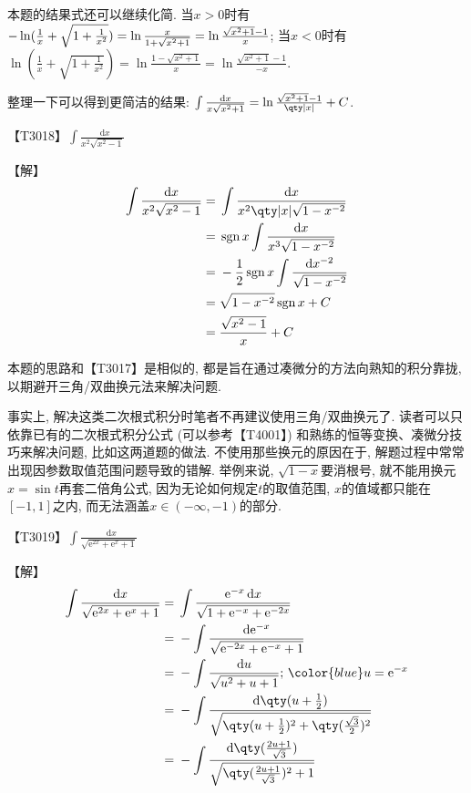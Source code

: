 \documentclass{ctexbook}
\DeclareMathOperator{\sgn}{sgn}
\newcommand{\e}{\mathrm{e}}
\newcommand*{\dif}{\mathop{}\!\mathrm{d}}
\begin{document}
{{本题的结果式还可以继续化简. 当$x>0$时有$-\ln(\frac{1}{x}+\sqrt{1+\frac{1}{x^{2}}})=\ln{\frac{x}{1+\sqrt{x^{2}+1}}}\\=\ln{\frac{\sqrt{x^{2}+1}-1}{x}}$; 当$x<0$时有$\ln(\frac{1}{x}+\sqrt{1+\frac{1}{x^{2}}})=\ln{\frac{1-\sqrt{x^{2}+1}}{x}}=\ln{\frac{\sqrt{x^{2}+1}-1}{-x}}$. \par
整理一下可以得到更简洁的结果: $\int\frac{\dif{x}}{x\sqrt{x^{2}+1}}=\ln{\frac{\sqrt{x^{2}+1}-1}{\qty|x|}}+C$. \par}
{\color{red}【T3018】}$\int\frac{\dif{x}}{x^{2}\sqrt{x^{2}-1}}$\par
【解】
\begin{align*}
\int\frac{\dif{x}}{x^{2}\sqrt{x^{2}-1}}={}&\int\frac{\dif{x}}{x^{2}\qty|x|\sqrt{1-x^{-2}}}\\
={}&\sgn{x}\int\frac{\dif{x}}{x^{3}\sqrt{1-x^{-2}}}\\
={}&-\frac{1}{2}\sgn{x}\int\frac{\dif{x^{-2}}}{\sqrt{1-x^{-2}}}\\
={}&\sqrt{1-x^{-2}}\sgn{x}+C\\
={}&\frac{\sqrt{x^{2}-1}}{x}+C
\end{align*}\par
{\kaishu 本题的思路和{\color{red}【T3017】}是相似的, 都是旨在通过凑微分的方法向熟知的积分靠拢, 以期避开三角/双曲换元法来解决问题. \par
事实上, 解决这类二次根式积分时笔者不再建议使用三角/双曲换元了. 读者可以只依靠已有的二次根式积分公式 (可以参考【T4001】) 和熟练的恒等变换、凑微分技巧来解决问题, 比如这两道题的做法. 不使用那些换元的原因在于, 解题过程中常常出现因参数取值范围问题导致的错解. 举例来说, $\sqrt{1-x}$要消根号, 就不能用换元$x=\sin{t}$再套二倍角公式, 因为无论如何规定$t$的取值范围, $x$的值域都只能在$\left[-1,1\right]$之内, 而无法涵盖$x\in\left(-\infty,-1\right)$的部分. \par}
{\color{red}【T3019】}$\int\frac{\dif{x}}{\sqrt{\e^{2x}+\e^{x}+1}}$\par
【解】
\begin{align*}
\int\frac{\dif{x}}{\sqrt{\e^{2x}+\e^{x}+1}}={}&\int\frac{\e^{-x}\dif{x}}{\sqrt{1+\e^{-x}+\e^{-2x}}}\\
={}&-\int\frac{\dif{\e^{-x}}}{\sqrt{\e^{-2x}+\e^{-x}+1}}\\
={}&-\int\frac{\dif{u}}{\sqrt{u^{2}+u+1}};\,{\color{blue}u=\e^{-x}}\\
={}&-\int\frac{\dif{\qty(u+\frac{1}{2})}}{\sqrt{\qty(u+\frac{1}{2})^{2}+\qty(\frac{\sqrt{3}}{2})^{2}}}\\
={}&-\int\frac{\dif{\qty(\frac{2u+1}{\sqrt{3}})}}{\sqrt{\qty(\frac{2u+1}{\sqrt{3}})^{2}+1}}\\

\end{align*}}
\end{document}
